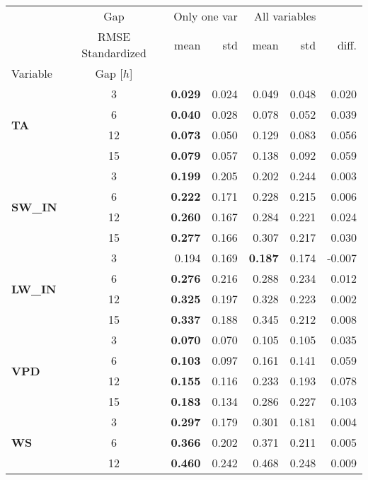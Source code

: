 \begin{table}
\centering
\begin{tabular}{p{2.1cm}c|rr|rr|r}
\toprule
 & Gap & \multicolumn{2}{r}{Only one var} & \multicolumn{2}{r}{All variables} &  \\
 & RMSE Standardized & mean & std & mean & std & diff. \\
Variable & Gap [$h$] &  &  &  &  &  \\
\midrule
\multirow[c]{4}{*}{\parbox{2.1cm}{\textbf{TA}}} & 3 & \bfseries 0.029 & 0.024 & 0.049 & 0.048 & 0.020 \\
 & 6 & \bfseries 0.040 & 0.028 & 0.078 & 0.052 & 0.039 \\
 & 12 & \bfseries 0.073 & 0.050 & 0.129 & 0.083 & 0.056 \\
 & 15 & \bfseries 0.079 & 0.057 & 0.138 & 0.092 & 0.059 \\
\cline{1-7}
\multirow[c]{4}{*}{\parbox{2.1cm}{\textbf{SW\_IN}}} & 3 & \bfseries 0.199 & 0.205 & 0.202 & 0.244 & 0.003 \\
 & 6 & \bfseries 0.222 & 0.171 & 0.228 & 0.215 & 0.006 \\
 & 12 & \bfseries 0.260 & 0.167 & 0.284 & 0.221 & 0.024 \\
 & 15 & \bfseries 0.277 & 0.166 & 0.307 & 0.217 & 0.030 \\
\cline{1-7}
\multirow[c]{4}{*}{\parbox{2.1cm}{\textbf{LW\_IN}}} & 3 & 0.194 & 0.169 & \bfseries 0.187 & 0.174 & -0.007 \\
 & 6 & \bfseries 0.276 & 0.216 & 0.288 & 0.234 & 0.012 \\
 & 12 & \bfseries 0.325 & 0.197 & 0.328 & 0.223 & 0.002 \\
 & 15 & \bfseries 0.337 & 0.188 & 0.345 & 0.212 & 0.008 \\
\cline{1-7}
\multirow[c]{4}{*}{\parbox{2.1cm}{\textbf{VPD}}} & 3 & \bfseries 0.070 & 0.070 & 0.105 & 0.105 & 0.035 \\
 & 6 & \bfseries 0.103 & 0.097 & 0.161 & 0.141 & 0.059 \\
 & 12 & \bfseries 0.155 & 0.116 & 0.233 & 0.193 & 0.078 \\
 & 15 & \bfseries 0.183 & 0.134 & 0.286 & 0.227 & 0.103 \\
\cline{1-7}
\multirow[c]{4}{*}{\parbox{2.1cm}{\textbf{WS}}} & 3 & \bfseries 0.297 & 0.179 & 0.301 & 0.181 & 0.004 \\
 & 6 & \bfseries 0.366 & 0.202 & 0.371 & 0.211 & 0.005 \\
 & 12 & \bfseries 0.460 & 0.242 & 0.468 & 0.248 & 0.009 \\

\end{tabular}
\end{table}
